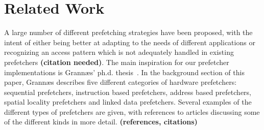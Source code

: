 
\section{Related Work}
\label{sec:relatedWork}

A large number of different prefetching strategies have been proposed,
with the intent of either being better at adapting to the needs of
different applications or recognizing an access pattern which is not
adequately handled in existing prefetchers \textbf{(citation
  needed)}. The main inspiration for our prefetcher implementations is
Grannæs' ph.d. thesis~\cite{Grannas}. In the background section of this
paper, Grannæs describes five different categories of hardware
prefetchers: sequential prefetchers, instruction based prefetchers,
address based prefetchers, spatial locality prefetchers and linked
data prefetchers. Several examples of the different types of
prefetchers are given, with references to articles discussing some of
the different kinds in more detail.  {\bf (references, citations)}
